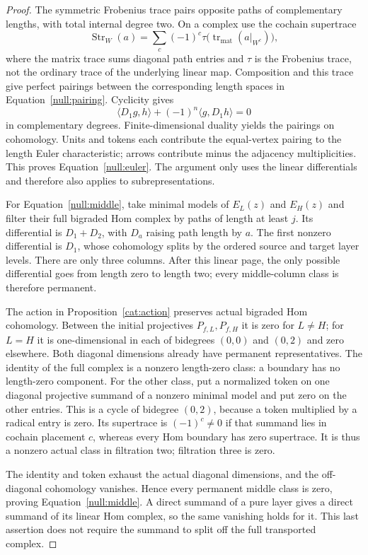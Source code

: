 \begin{proof}
The symmetric Frobenius trace pairs opposite paths of complementary
lengths, with total internal degree two.  On a complex use the
cochain supertrace
\[
 \operatorname{Str}_W(a)
   =\sum_c(-1)^c\tau\bigl(\operatorname{tr}_{\mathrm{mat}}(a|_{W^c})\bigr),
\]
where the matrix trace sums diagonal path entries and $\tau$ is the
Frobenius trace, not the ordinary trace of the underlying linear map.  Composition
and this trace give perfect pairings between the corresponding length
spaces in Equation~\eqref{null:pairing}.  Cyclicity gives
\[
 \langle D_1g,h\rangle+(-1)^n\langle g,D_1h\rangle=0
\]
in complementary degrees.  Finite-dimensional duality yields the
pairings on cohomology.  Units and tokens each contribute the
equal-vertex pairing to the length Euler characteristic; arrows
contribute minus the adjacency multiplicities.  This proves
Equation~\eqref{null:euler}.  The argument only uses the linear
differentials and therefore also applies to subrepresentations.

For Equation~\eqref{null:middle}, take minimal models of $E_L(z)$ and
$E_H(z)$ and filter their full bigraded Hom complex by paths of length
at least $j$.  Its differential is $D_1+D_2$, with $D_a$ raising path
length by $a$.  The first nonzero differential is $D_1$, whose
cohomology splits by the ordered source and target layer levels.
There are only three columns.  After this linear page, the only
possible differential goes from length zero to length two; every
middle-column class is therefore permanent.

The action in Proposition~\ref{cat:action} preserves actual bigraded
Hom cohomology.  Between the initial projectives $P_{f,L},P_{f,H}$
it is zero for $L\ne H$; for $L=H$ it is one-dimensional in each of
bidegrees $(0,0)$ and $(0,2)$ and zero elsewhere.  Both diagonal
dimensions already have permanent representatives.  The identity of
the full complex is a nonzero length-zero class: a boundary has no
length-zero component.  For the other class, put a normalized token
on one diagonal projective summand of a nonzero minimal model and put
zero on the other entries.  This is a cycle of bidegree $(0,2)$,
because a token multiplied by a radical entry is zero.  Its
supertrace is $(-1)^c\ne0$ if that summand lies in cochain placement
$c$, whereas every Hom boundary has zero supertrace.  It is thus a
nonzero actual class in filtration two; filtration three is zero.

The identity and token exhaust the actual diagonal dimensions, and
the off-diagonal cohomology vanishes.  Hence every permanent middle
class is zero, proving Equation~\eqref{null:middle}.  A direct
summand of a pure layer gives a direct summand of its linear Hom
complex, so the same vanishing holds for it.  This last assertion
does not require the summand to split off the full transported complex.
\end{proof}

